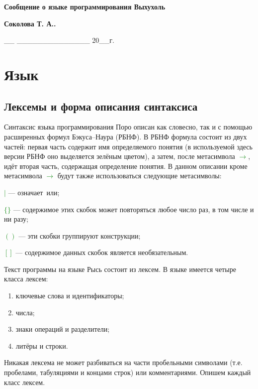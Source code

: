 \documentclass[10pt]{report}
\begin{document}
\begin{titlepage}
\begin{center}
\vspace*{8cm}

{\bf\Huge
Сообщение о языке программирования Выхухоль 

} \vspace{2.5cm}


\LARGE
\textbf{Соколова Т. А..}

 \vspace{2.5cm}

{__ ______________  20__г.}

\end{center}
\end{titlepage}
\tableofcontents

\newpage

\chapter{Язык}
    \section{Лексемы и форма описания синтаксиса}

Синтаксис языка программирования Поро описан как словесно, так и с помощью расширенных формул Бэкуса--Наура (РБНФ). В РБНФ формула состоит из двух частей: первая часть содержит имя определяемого понятия (в используемой здесь версии РБНФ оно выделяется зелёным цветом), а затем, после метасимвола \textcolor{Green}{$\to$}, идёт вторая часть, содержащая определение понятия. В данном описании кроме метасимвола \textcolor{Green}{$\to$} будут также использоваться следующие метасимволы:

\textcolor{Green}{$|$} --- означает\ \glqq или\grqq;

\textcolor{Green}{$\{\}$} --- содержимое этих скобок может повторяться любое число раз, в том числе и ни разу;

\textcolor{Green}{$( )$} --- эти скобки группируют конструкции;

\textcolor{Green}{$[ ]$} --- содержимое данных скобок является необязательным.

Текст программы на языке Рысь состоит из лексем. В языке имеется четыре класса лексем:
\begin{enumerate}
    \item ключевые слова и идентификаторы;
    \item числа;
    \item знаки операций и разделители;
    \item литёры и строки.
\end{enumerate}
Никакая лексема не может разбиваться на части пробельными символами (т.е. пробелами, табуляциями и концами строк) или комментариями. Опишем каждый класс лексем.
\end{document}
